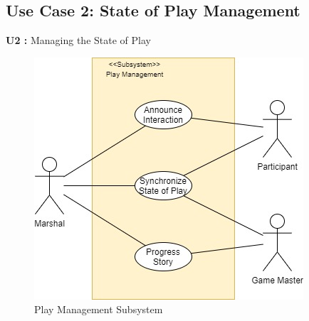 \subsection{Use  Case 2: State of Play Management}
\textbf{U2 :} Managing the State of Play
\begin{figure}[h!]
\centering
\includegraphics[scale=0.75]{images/EventManagement.jpg}
\caption{Play Management Subsystem}
\label{fig:EventManagement}
\end{figure}

